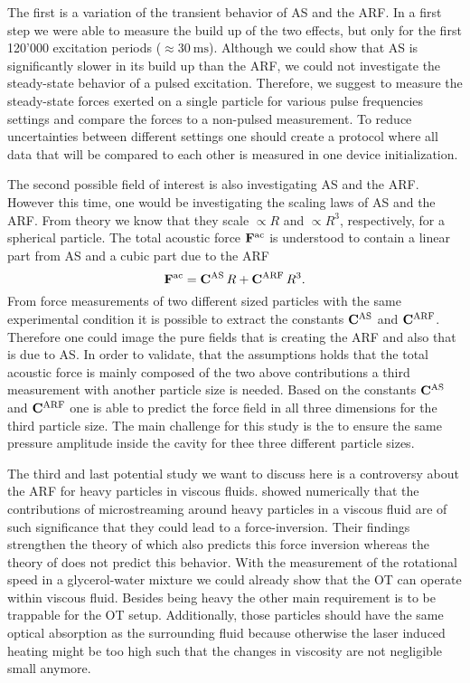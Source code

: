 The first is a variation of the transient behavior of AS and the ARF. In a 
first step we were able to measure the build up of the two effects, but only 
for the first 120'000 excitation periods ($\approx \SI{30}{\ms}$). Although we 
could show that AS is significantly slower in its build up than the ARF, we 
could not investigate the steady-state behavior of a pulsed excitation. 
Therefore, we suggest to measure the steady-state forces exerted on a single 
particle for various pulse frequencies settings and compare the forces to a 
non-pulsed measurement. To reduce uncertainties between different settings one 
should create a protocol where all data that will be compared to each other is 
measured in one device initialization.

The second possible field of interest is also investigating AS and the ARF.  
However this time, one would be investigating the scaling laws of AS and the 
ARF. From theory we know that they scale $\propto R$ and $\propto R^{3}$, 
respectively, for a spherical particle. The total acoustic force 
$\vb{F}^{\mathrm{ac}}$ is understood to contain a linear part from AS and a 
cubic part due to the ARF
\begin{equation}
  \vb{F}^{\mathrm{ac}} = \vb{C}^{\mathrm{AS}}\,R + \vb{C}^{\mathrm{ARF}}\,R^{3}.
\end{equation}
From force measurements of two different sized particles with the same 
experimental condition it is possible to extract the constants 
$\vb{C}^{\mathrm{AS}}$ and $\vb{C}^{\mathrm{ARF}}$. Therefore one could image the pure 
fields that is creating the ARF and also that is due to AS. In order to 
validate, that the assumptions holds that the total acoustic force is mainly 
composed of the two above contributions a third measurement with another 
particle size is needed. Based on the constants $\vb{C}^{\mathrm{AS}}$ and 
$\vb{C}^{\mathrm{ARF}}$ one is able to predict the force field in all three 
dimensions for the third particle size. The main challenge for this study is 
the to ensure the same pressure amplitude inside the cavity for thee three 
different particle sizes.

The third and last potential study we want to discuss here is a controversy 
about the ARF for heavy particles in viscous fluids.  showed 
numerically that the contributions of microstreaming around heavy particles in 
a viscous fluid are of such significance that they could lead to a 
force-inversion. Their findings strengthen the theory of 
 which also predicts this force inversion whereas the 
theory of  does not predict this behavior. With the 
measurement of the rotational speed in a glycerol-water mixture we could 
already show that the OT can operate within viscous fluid. Besides being heavy 
the other main requirement is to be trappable for the OT setup. Additionally, 
those particles should have the same optical absorption as the surrounding 
fluid because otherwise the laser induced heating might be too high such that 
the changes in viscosity are not negligible small anymore.

